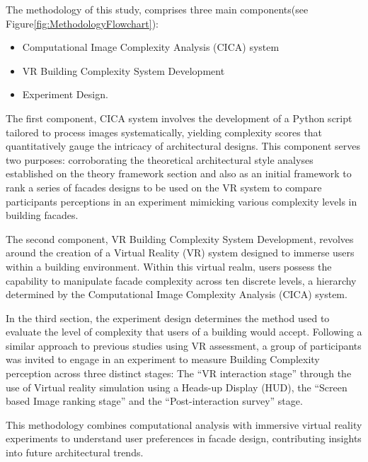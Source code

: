 The methodology of this study, comprises three main components(see Figure\ref{fig:MethodologyFlowchart}):
\begin{itemize}
    \item Computational Image Complexity Analysis (CICA) system
    \item VR Building Complexity System Development
    \item Experiment Design.
\end{itemize}

The first component, CICA system involves the development of a Python script tailored to process images systematically, yielding complexity scores that quantitatively gauge the intricacy of architectural designs.
This component serves two purposes: corroborating the theoretical architectural style analyses established on the theory framework section and also as an initial framework to rank a series of facades designs to be used on the VR system to compare participants perceptions in an experiment mimicking various complexity levels in building facades.

The second component, VR Building Complexity System Development, revolves around the creation of a Virtual Reality (VR) system designed to immerse users within a building environment.
Within this virtual realm, users possess the capability to manipulate facade complexity across ten discrete levels, a hierarchy determined by the Computational Image Complexity Analysis (CICA) system.

In the third section, the experiment design determines the method used to evaluate the level of complexity that users of a building would accept.
Following a similar approach to previous studies using VR assessment\cite{Wolfartsberger2019}, a group of participants was invited to engage in an experiment to measure Building Complexity perception across three distinct stages: The ``VR interaction stage'' through the use of Virtual reality simulation using a Heads-up Display (HUD), the ``Screen based Image ranking stage'' and the ``Post-interaction survey'' stage.

This methodology combines computational analysis with immersive virtual reality experiments to understand user preferences in facade design, contributing insights into future architectural trends.


